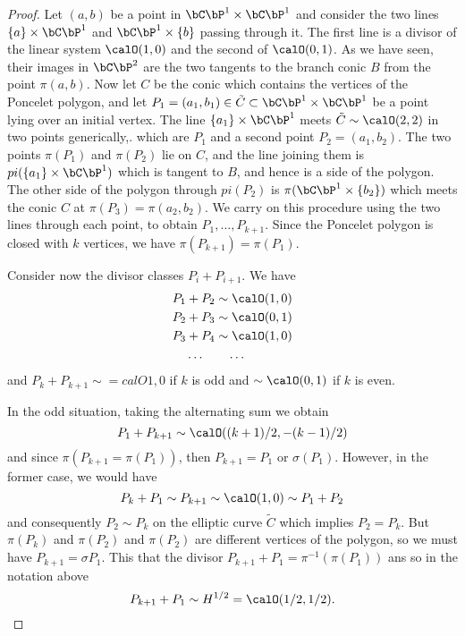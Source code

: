 \begin{proof}
Let $(a, b)$ be a point in $\bC\bP^{1} \times \bC\bP^{1}$ and consider the two lines $\{a\} \times \bC\bP^{1}$ and $\bC\bP^{1} \times \{b\}$ passing through it. The first line is a divisor of the linear system $\calO(1,0)$ and the second of $\calO(0,1)$. As we have seen, their images in $\bC\bP^{2}$ are the two tangents to the branch conic $B$ from the point $\pi(a, b)$. Now let $C$ be the conic which contains the vertices of the Poncelet polygon, and let $P_{1} =(a_{1}, b_{1}) \in \tilde{C} \subset \bC\bP^{1} \times \bC\bP^{1}$ be a point lying over an initial vertex. The line $\{a_{1}\} \times \bC\bP^{1}$ meets $\tilde{C}\sim \calO(2,2)$ in two points generically,. which are $P_{1}$ and a second point $P_{2} = (a_{1}, b_{2})$. The two points $\pi(P_{1})$ and $\pi(P_{2})$ lie on $C$, and the line joining them is $pi(\{a_{1}\} \times \bC\bP^{1})$ which is tangent to $B$, and hence is a side of the polygon. The other side of the polygon through $pi(P_{2})$ is $\pi(\bC\bP^{1} \times\{b_{2}\})$ which meets the conic $C$ at $\pi(P_{3}) = \pi(a_{2}, b_{2})$. We carry on this procedure using the two lines through each point, to obtain $P_{1}, \ldots, P_{k+1}$. Since the Poncelet polygon is closed with $k$ vertices, we have $\pi(P_{k+1}) = \pi(P_{1})$.

Consider now the divisor classes $P_{i} + P_{i+1}$. We have
\begin{align*}
P_{1}+ P_{2} &\sim \calO(1,0)\\
P_{2}+ P_{3} &\sim \calO(0,1)\\
P_{3}+ P_{4} &\sim \calO(1,0)\\
\ldots  \quad     & \quad \ldots
\end{align*}
and $P_{k} + P_{k+1} \sim =calO{1, 0}$ if $k$ is odd and $\sim \calO(0,1)$ if $k$ is even.

In the odd situation, taking the alternating sum we obtain
\begin{equation}\label{art7-eq-10}
P_{1} +P_{k+1} \sim \calO ((k+1)/2, -(k-1)/2)
\end{equation}
and since $\pi(P_{k+1} = \pi(P_{1}))$, then $P_{k+1} = P_{1}$ or  $\sigma(P_{1})$. However, in the former case, we would have
$$
P_{k}+P_{1}\sim P_{k+1}\sim \calO(1,0)\sim P_{1}+P_{2}
$$
and consequently $P_{2}\sim P_{k}$ on the elliptic curve $\tilde{C}$ which implies $P_{2} = P_{k}$. But $\pi(P_{k})$ and $\pi(P_{2})$ and $\pi(P_{2})$ are different vertices of the polygon, so we must have $P_{k+1} = \sigma P_{1}$. This that the divisor $P_{k+1} +P_{1} = \pi^{-1}(\pi(P_{1}))$ ans so in the notation above
$$
P_{k+1} + P_{1}\sim H^{1/2} = \calO(1/2, 1/2).
$$


\end{proof}
